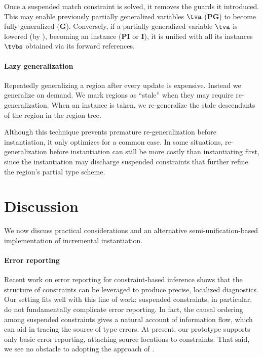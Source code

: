 \documentclass[acmsmall,screen,nonacm%
\Anonymous{,anonymous}{}%
\Final{}{,review}%
]{acmart}
\begin{document}
Once a suspended match constraint is solved, it removes the guards it
introduced.  This may enable previously partially generalized variables $\tv$
(\textbf{PG}) to become fully generalized (\textbf{G}). Conversely, if a
partially generalized variable $\tv$ is lowered (\eg by ),
becoming an instance (\textbf{PI} or \textbf{I}), it is unified with all its
instances $\tvbs$ obtained via its forward references.

\paragraph{Lazy generalization}

Repeatedly generalizing a region after every update is expensive.  Instead we
generalize on demand. We mark regions as ``stale'' when they may require
re-generalization. When an instance is taken, we re-generalize the stale
descendants of the region in the region tree.


Although this technique prevents premature re-generalization before
instantiation, it only optimizes for a common case. In some situations,
re-generalization before instantiation can still be more costly than
instantiating first, since the instantiation may discharge suspended
constraints that further refine the region's partial type scheme.

\section{Discussion}
\label{sec/discussion}

We now discuss practical considerations and an alternative
semi-unification-based implementation of incremental instantiation.


\paragraph{Error reporting}

Recent work on error reporting for constraint-based inference
\citep*{journals/pacmpl/BhanukaPBB23} shows that the structure of constraints
can be leveraged to produce precise, localized diagnostics. 
%
Our setting fits well with this line of work: suspended constraints, in
particular, do not fundamentally complicate error reporting. 
% 
In fact, the causal ordering among suspended constraints gives a natural
account of information flow, which can aid in tracing the source of type
errors. 
%
At present, our prototype supports only basic error reporting, attaching source
locations to constraints. That said, we see no obstacle to adopting the
approach of \citet*{journals/pacmpl/BhanukaPBB23}.
\end{document}
